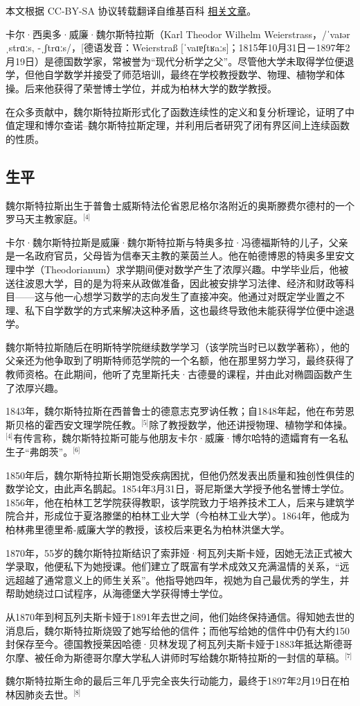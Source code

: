 
本文根据 CC-BY-SA 协议转载翻译自维基百科 \href{https://en.wikipedia.org/wiki/Karl_Weierstrass}{相关文章}。

卡尔·西奥多·威廉·魏尔斯特拉斯（Karl Theodor Wilhelm Weierstrass，/ˈvaɪərˌstrɑːs, -ˌʃtrɑːs/，[德语发音：Weierstraß [ˈvaɪɐʃtʁaːs]；1815年10月31日－1897年2月19日）是德国数学家，常被誉为“现代分析学之父”。尽管他大学未取得学位便退学，但他自学数学并接受了师范培训，最终在学校教授数学、物理、植物学和体操。后来他获得了荣誉博士学位，并成为柏林大学的数学教授。

在众多贡献中，魏尔斯特拉斯形式化了函数连续性的定义和复分析理论，证明了中值定理和博尔查诺–魏尔斯特拉斯定理，并利用后者研究了闭有界区间上连续函数的性质。
\subsection{生平}
魏尔斯特拉斯出生于普鲁士威斯特法伦省恩尼格尔洛附近的奥斯滕费尔德村的一个罗马天主教家庭。\(^\text{[4]}\)

卡尔·魏尔斯特拉斯是威廉·魏尔斯特拉斯与特奥多拉·冯德福斯特的儿子，父亲是一名政府官员，父母皆为信奉天主教的莱茵兰人。他在帕德博恩的特奥多里安文理中学（Theodorianum）求学期间便对数学产生了浓厚兴趣。中学毕业后，他被送往波恩大学，目的是为将来从政做准备，因此被安排学习法律、经济和财政等科目——这与他一心想学习数学的志向发生了直接冲突。他通过对既定学业置之不理、私下自学数学的方式来解决这种矛盾，这也最终导致他未能获得学位便中途退学。

魏尔斯特拉斯随后在明斯特学院继续数学学习（该学院当时已以数学著称），他的父亲还为他争取到了明斯特师范学院的一个名额，他在那里努力学习，最终获得了教师资格。在此期间，他听了克里斯托夫·古德曼的课程，并由此对椭圆函数产生了浓厚兴趣。

1843年，魏尔斯特拉斯在西普鲁士的德意志克罗讷任教；自1848年起，他在布劳恩斯贝格的霍西安文理学院任教。\(^\text{[5]}\)除了教授数学，他还讲授物理、植物学和体操。\(^\text{[4]}\)有传言称，魏尔斯特拉斯可能与他朋友卡尔·威廉·博尔哈特的遗孀育有一名私生子“弗朗茨”。\(^\text{[6]}\)

1850年后，魏尔斯特拉斯长期饱受疾病困扰，但他仍然发表出质量和独创性俱佳的数学论文，由此声名鹊起。1854年3月31日，哥尼斯堡大学授予他名誉博士学位。1856年，他在柏林工艺学院获得教职，该学院致力于培养技术工人，后来与建筑学院合并，形成位于夏洛滕堡的柏林工业大学（今柏林工业大学）。1864年，他成为柏林弗里德里希-威廉大学的教授，该校后来更名为柏林洪堡大学。

1870年，55岁的魏尔斯特拉斯结识了索菲娅·柯瓦列夫斯卡娅，因她无法正式被大学录取，他便私下为她授课。他们建立了既富有学术成效又充满温情的关系，“远远超越了通常意义上的师生关系”。他指导她四年，视她为自己最优秀的学生，并帮助她绕过口试程序，从海德堡大学获得博士学位。

从1870年到柯瓦列夫斯卡娅于1891年去世之间，他们始终保持通信。得知她去世的消息后，魏尔斯特拉斯烧毁了她写给他的信件；而他写给她的信件中仍有大约150封保存至今。德国教授莱因哈德·贝林发现了柯瓦列夫斯卡娅于1883年抵达斯德哥尔摩、被任命为斯德哥尔摩大学私人讲师时写给魏尔斯特拉斯的一封信的草稿。\(^\text{[7]}\)

魏尔斯特拉斯生命的最后三年几乎完全丧失行动能力，最终于1897年2月19日在柏林因肺炎去世。\(^\text{[8]}\)
